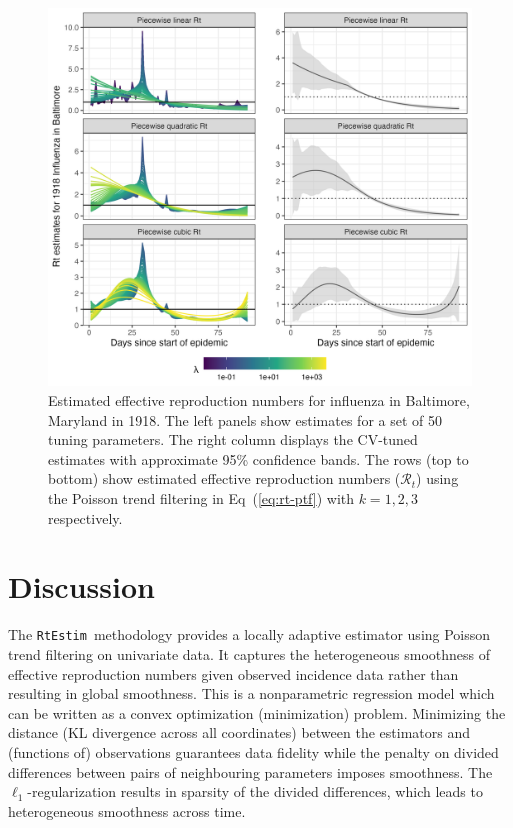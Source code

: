 \documentclass[10pt,letterpaper]{article}
\def\RtEstim{\texttt{RtEstim}}
\def\calR{\mathcal{R}}
\renewcommand{\eqref}[1]{Eq~(\ref{#1})}
\begin{document}
\begin{figure}[!h]
  \centering
  \includegraphics[width=0.9\linewidth]{fig/flu_full_res.png}
  \caption{Estimated effective reproduction numbers for influenza in Baltimore,
  Maryland in 1918. The left panels show estimates for a set of 50 tuning
  parameters. The right column displays the CV-tuned estimates with approximate
  95\% confidence bands. The rows (top to bottom) show estimated effective reproduction
  numbers ($\calR_t$) using the Poisson trend filtering in \eqref{eq:rt-ptf}
  with $k=1,2,3$ respectively.} 
  \label{fig:flu-res}
\end{figure} 


\section{Discussion}

The \RtEstim\ methodology provides a locally adaptive estimator using Poisson
trend filtering on univariate data. It captures the heterogeneous smoothness of
effective reproduction numbers given observed incidence data rather than
resulting in global smoothness. This is a nonparametric regression model which
can be written as a convex optimization (minimization) problem. Minimizing the
distance (KL divergence across all coordinates) between the estimators and
(functions of) observations guarantees data fidelity while the penalty on divided
differences between pairs of neighbouring parameters imposes smoothness. The
$\ell_1$-regularization results in sparsity of the divided differences, which
leads to heterogeneous smoothness across time. 
\end{document}
